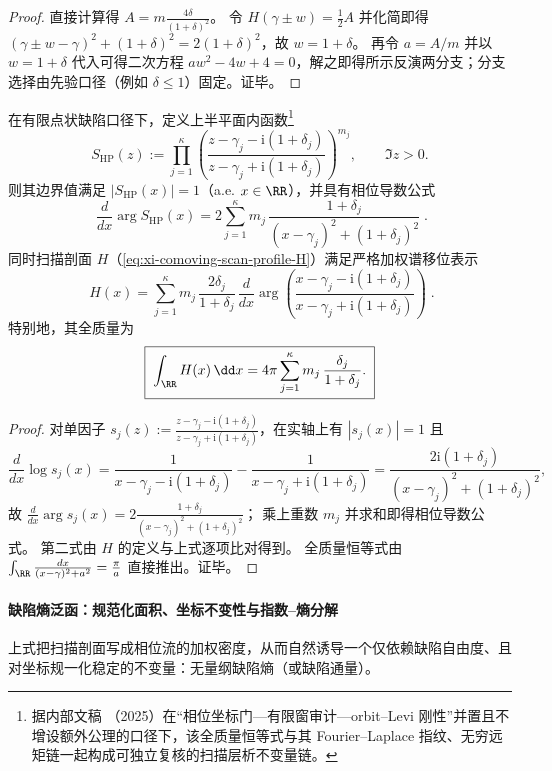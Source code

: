 \begin{proof}
直接计算得
\(
A=m\frac{4\delta}{(1+\delta)^2}
\)。
令 \(H(\gamma\pm w)=\tfrac12A\) 并化简即得
\(
(\gamma\pm w-\gamma)^2+(1+\delta)^2=2(1+\delta)^2
\)，故 \(w=1+\delta\)。
再令 \(a=A/m\) 并以 \(w=1+\delta\) 代入可得二次方程
\(
a w^2-4w+4=0
\)，解之即得所示反演两分支；分支选择由先验口径（例如 \(\delta\le 1\)）固定。证毕。
\end{proof}

\begin{proposition}\label{prop:xi-scan-density-spectral-shift-phase-derivative}
在有限点状缺陷口径下，定义上半平面内函数\footnote{据内部文稿 \cite{Internal2025ResolutionFoldingPhiPi}（2025）在“相位坐标门—有限窗审计—orbit--Levi 刚性”并置且不增设额外公理的口径下，该全质量恒等式与其 Fourier--Laplace 指纹、无穷远矩链一起构成可独立复核的扫描层析不变量链。}
\[
S_{\mathrm{HP}}(z)
:=\prod_{j=1}^{\kappa}\left(\frac{z-\gamma_j-\mathrm{i}(1+\delta_j)}{z-\gamma_j+\mathrm{i}(1+\delta_j)}\right)^{m_j},
\qquad \Im z>0.
\]
则其边界值满足 \(|S_{\mathrm{HP}}(x)|=1\)（a.e. \(x\in\RR\)），并具有相位导数公式
\[
\boxed{\;
\frac{d}{dx}\arg S_{\mathrm{HP}}(x)
=2\sum_{j=1}^{\kappa}m_j\,\frac{1+\delta_j}{(x-\gamma_j)^2+(1+\delta_j)^2}\; }.
\]
同时扫描剖面 \(H\)（\eqref{eq:xi-comoving-scan-profile-H}）满足严格加权谱移位表示
\[
\boxed{\;
H(x)
=\sum_{j=1}^{\kappa}m_j\,\frac{2\delta_j}{1+\delta_j}\,
\frac{d}{dx}\arg\!\left(\frac{x-\gamma_j-\mathrm{i}(1+\delta_j)}{x-\gamma_j+\mathrm{i}(1+\delta_j)}\right)\; }.
\]
特别地，其全质量为
\[
\boxed{\;\int_{\RR}H(x)\,\dd x
=4\pi\sum_{j=1}^{\kappa}m_j\,\frac{\delta_j}{1+\delta_j}.\;}
\]
\end{proposition}

\begin{proof}
对单因子 \(s_{j}(z):=\frac{z-\gamma_j-\mathrm{i}(1+\delta_j)}{z-\gamma_j+\mathrm{i}(1+\delta_j)}\)，在实轴上有 \(|s_j(x)|=1\) 且
\[
\frac{d}{dx}\log s_j(x)
=\frac{1}{x-\gamma_j-\mathrm{i}(1+\delta_j)}-\frac{1}{x-\gamma_j+\mathrm{i}(1+\delta_j)}
=\frac{2\mathrm{i}(1+\delta_j)}{(x-\gamma_j)^2+(1+\delta_j)^2},
\]
故 \(\frac{d}{dx}\arg s_j(x)=2\frac{1+\delta_j}{(x-\gamma_j)^2+(1+\delta_j)^2}\)；
乘上重数 \(m_j\) 并求和即得相位导数公式。
第二式由 \(H\) 的定义与上式逐项比对得到。
全质量恒等式由 \(\int_{\RR}\frac{dx}{(x-\gamma)^2+a^2}=\frac{\pi}{a}\) 直接推出。证毕。
\end{proof}

\paragraph{缺陷熵泛函：规范化面积、坐标不变性与指数--熵分解}
上式把扫描剖面写成相位流的加权密度，从而自然诱导一个仅依赖缺陷自由度、且对坐标规一化稳定的不变量：无量纲缺陷熵（或缺陷通量）。

